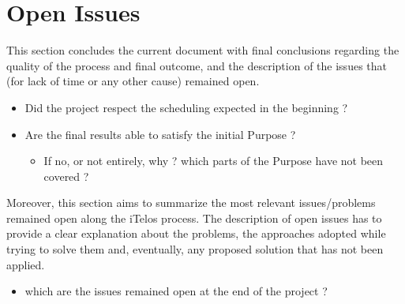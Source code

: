 \section{Open Issues}

This section concludes the current document with final conclusions regarding the quality of the process and final outcome, and the description of the issues that (for lack of time or any other cause) remained open.\\

\begin{itemize}
    \item Did the project respect the scheduling expected in the beginning ?
    \item Are the final results able to satisfy the initial Purpose ?
        \begin{itemize}
            \item If no, or not entirely, why ? which parts of the Purpose have not been covered ?
        \end{itemize}
\end{itemize}


\noindent Moreover, this section aims to summarize the most relevant issues/problems remained open along the iTelos process. The description of open issues has to provide a clear explanation about the problems, the approaches adopted while trying to solve them and, eventually, any proposed solution that has not been applied.\\

\begin{itemize}
    \item which are the issues remained open at the end of the project ?
\end{itemize}